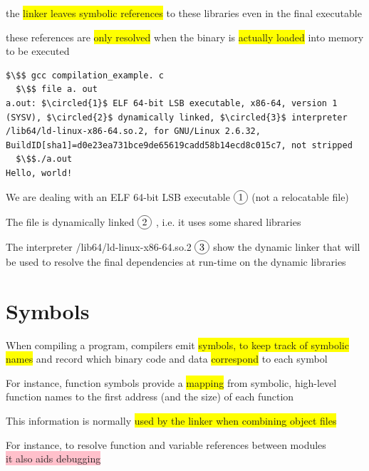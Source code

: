 \documentclass[]{project_plan}
\newcommand*\circled[1]{\tikz[baseline=(char.base)]{
            \node[shape=circle,draw,inner sep=2pt] (char) {#1};}}
\begin{document}
the \colorbox{yellow}{linker leaves symbolic references} to these libraries even in the
final executable

these references are \colorbox{yellow}{only resolved} when the binary is \colorbox{yellow}{actually loaded} into
memory to be executed

\begin{lstlisting}[mathescape]
  $\$$ gcc compilation_example. c
  $\$$ file a. out
a.out: $\circled{1}$ ELF 64-bit LSB executable, x86-64, version 1 (SYSV), $\circled{2}$ dynamically linked, $\circled{3}$ interpreter /lib64/ld-linux-x86-64.so.2, for GNU/Linux 2.6.32,
BuildID[sha1]=d0e23ea731bce9de65619cadd58b14ecd8c015c7, not stripped
  $\$$./a.out
Hello, world!
\end{lstlisting}

We are dealing with an ELF 64-bit LSB executable $\circled{1}$ (not a relocatable file)

The file is dynamically linked $\circled{2}$ , i.e. it uses some shared libraries

The interpreter /lib64/ld-linux-x86-64.so.2 $\circled{3}$ show the dynamic
linker that will be used to resolve the final dependencies at run-time on the
dynamic libraries

\section{Symbols}

When compiling a program, compilers emit \colorbox{yellow}{symbols, to keep track of symbolic names} and record which binary code and data
\colorbox{yellow}{correspond} to each symbol

For instance, function symbols provide a \colorbox{yellow}{mapping} from symbolic, high-level
function names to the first address (and the size) of each function

This information is normally \colorbox{yellow}{used by the linker when combining object files}

For instance, to resolve function and variable references between modules\\
\colorbox{pink}{it also aids debugging}
\end{document}
